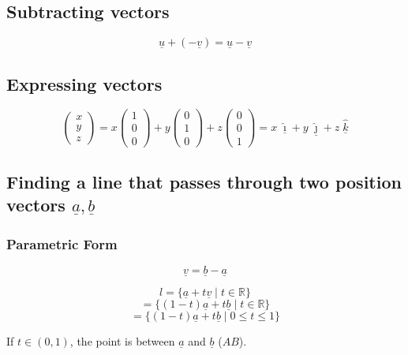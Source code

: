\documentclass[00_complete]{subfiles}
\begin{document}
\subsection{Subtracting vectors}

$$\underline u + (-\underline v) = \underline u - \underline v$$

\subsection{Expressing vectors}

$$\begin{pmatrix}
    x\\y\\z
\end{pmatrix} = x\begin{pmatrix}
    1\\0\\0
\end{pmatrix} + y\begin{pmatrix}
    0\\1\\0
\end{pmatrix} + z\begin{pmatrix}
    0\\0\\1
\end{pmatrix}
= x\;\underline{\hat \imath} + y\;\underline{\hat \jmath} + z\;\underline{\hat k}$$

\subsection{Finding a line that passes through two position vectors
\texorpdfstring{$\underline a,\underline b$}{a, b}}

\subsubsection{Parametric Form}

$$\underline v = \underline b - \underline a$$

$$l = \{ \underline a + t \underline v \;|\; t \in \mathbb{R}\}$$
$$= \{(1-t)\underline a + t \underline b \;|\; t \in \mathbb{R}\}$$
$$= \{(1-t)\underline a + t \underline b \;|\; 0 \leq t \leq 1\}$$

If $t \in (0,1)$, the point is between $\underline a$ and $\underline b$ ($AB$).
\end{document}
